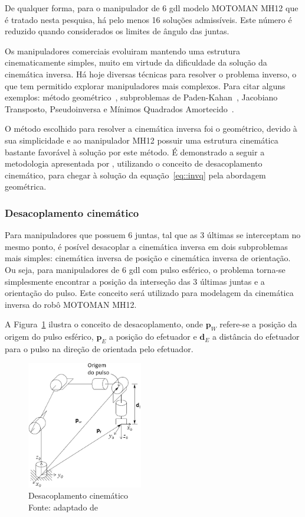 De qualquer forma, para o manipulador de 6 gdl modelo MOTOMAN MH12 que é tratado
nesta pesquisa, há pelo menos 16 soluções admissíveis. Este número é
reduzido quando considerados os limites de ângulo das juntas.

Os manipuladores comerciais evoluiram mantendo uma estrutura cinematicamente
simples, muito em virtude da dificuldade da solução da cinemática inversa.
Há hoje diversas
técnicas para resolver o problema inverso, o que tem permitido explorar
manipuladores mais complexos. Para citar alguns exemplos:
método geométrico~\cite{spong2006robot}, 
subproblemas de Paden-Kahan~\cite{murray1994mathematical}, 
Jacobiano Transposto, Pseudoinversa e Mínimos Quadrados
Amortecido~\cite{buss2004introduction}.

O método escolhido para resolver a cinemática inversa foi o geométrico, devido à
sua simplicidade e ao manipulador MH12 possuir uma estrutura cinemática bastante
favorável à solução por este método. É demonstrado a seguir a metodologia
apresentada por \citet{spong2006robot}, utilizando o conceito de desacoplamento
cinemático, para chegar à solução da equação~\ref{eq::invq} pela abordagem
geométrica.


\subsubsection{Desacoplamento cinemático}

Para manipuladores que possuem 6 juntas, tal que as 3 últimas se interceptam no
mesmo ponto, é posível desacoplar a cinemática inversa em dois subproblemas mais
simples: cinemática inversa de posição e cinemática inversa de orientação. Ou
seja, para manipuladores de 6 gdl com pulso esférico, o problema torna-se
simplesmente encontrar a posição da interseção das 3 últimas juntas e a
orientação do pulso. Este conceito será utilizado para modelagem da cinemática
inversa do robô MOTOMAN MH12.

A Figura~\ref{fig::decoupling} ilustra o conceito de desacoplamento, onde
$\mathbf{p}_W$ refere-se a posição da origem do pulso esférico, $\mathbf{p}_E$ a
posição do efetuador e $\mathbf{d}_E$ a distância do efetuador para o pulso na direção
de orientada pelo efetuador.

\begin{figure}[h]
	\centering 
 	\includegraphics[width=0.45\textwidth]{figs/decoupling}
 	\caption[Desacoplamento cinemático]{Desacoplamento cinemático \\ Fonte:
 	adaptado de~\cite{spong2006robot}}
 	\label{fig::decoupling}
\end{figure}


